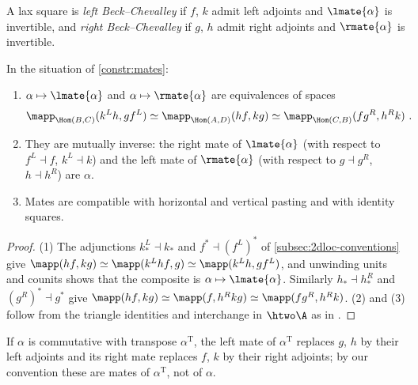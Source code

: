 \begin{defi}
\label{def:BC}
A lax square is \emph{left Beck--Chevalley} if $f$, $k$ admit left adjoints and $\lmate{\alpha}$ is invertible, and \emph{right Beck--Chevalley} if $g$, $h$ admit right adjoints and $\rmate{\alpha}$ is invertible.
\end{defi}

\begin{lem}
\label{lem:mate-correspondence}
In the situation of \cref{constr:mates}:
\begin{enumerate}
\item $\alpha \mapsto \lmate{\alpha}$ and $\alpha \mapsto \rmate{\alpha}$ are equivalences of spaces
\[
\mapp_{\Hom(B,C)}(k^{L}h,gf^{L}) \simeq \mapp_{\Hom(A,D)}(hf,kg) \simeq \mapp_{\Hom(C,B)}(fg^{R},h^{R}k) \ .
\]
\item They are mutually inverse: the right mate of $\lmate{\alpha}$ (with respect to $f^{L} \dashv f$, $k^{L} \dashv k$) and the left mate of $\rmate{\alpha}$ (with respect to $g \dashv g^{R}$, $h \dashv h^{R}$) are $\alpha$.
\item Mates are compatible with horizontal and vertical pasting and with identity squares.
\end{enumerate}
\end{lem}

\begin{proof}
(1) The adjunctions $k^{L}_{*} \dashv k_{*}$ and $f^{*} \dashv (f^{L})^{*}$ of \cref{subsec:2dloc-conventions} give
$\mapp(hf,kg) \simeq \mapp(k^{L}hf,g) \simeq \mapp(k^{L}h,gf^{L})$, and unwinding units and counits shows that the composite is $\alpha \mapsto \lmate{\alpha}$. Similarly $h_{*} \dashv h^{R}_{*}$ and $(g^{R})^{*} \dashv g^{*}$ give
$\mapp(hf,kg) \simeq \mapp(f,h^{R}kg) \simeq \mapp(fg^{R},h^{R}k)$.
(2) and (3) follow from the triangle identities and interchange in $\htwo\A$ as in \cite{kellystreet1974review}.
\end{proof}

\begin{rmk}
\label{rmk:mates-memo}
If $\alpha$ is commutative with transpose $\alpha^{\mathrm{T}}$, the left mate of $\alpha^{\mathrm{T}}$ replaces $g$, $h$ by their left adjoints and its right mate replaces $f$, $k$ by their right adjoints; by our convention these are mates of $\alpha^{\mathrm{T}}$, not of $\alpha$.
\end{rmk}
